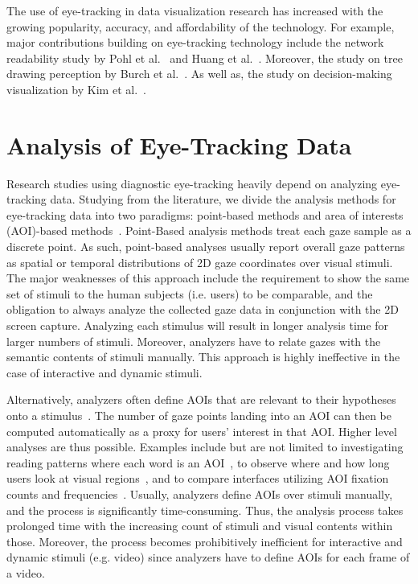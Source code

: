 The use of eye-tracking in data visualization research has increased with the growing popularity, accuracy, and affordability of the technology. For example, major contributions building on eye-tracking technology include the network readability study by Pohl et al.~\cite{Poh09} and Huang et al.~\cite{Hua08, Hua05}. Moreover, the study on tree drawing perception by Burch et al.~\cite{Bur11, Bur13}. As well as, the study on decision-making visualization by Kim et al.~\cite{Kim12}.

\section{Analysis of Eye-Tracking Data}
Research studies using diagnostic eye-tracking heavily depend on analyzing eye-tracking data. Studying from the literature, we divide the analysis methods for eye-tracking data into two paradigms: point-based methods and area of interests (AOI)-based methods~\cite{Bla14}. Point-Based analysis methods treat each gaze sample as a discrete point. As such, point-based analyses usually report overall gaze patterns as spatial or temporal distributions of 2D gaze coordinates over visual stimuli. The major weaknesses of this approach include the requirement to show the same set of stimuli to the human subjects (i.e. users) to be comparable, and the obligation to always analyze the collected gaze data in conjunction with the 2D screen capture. Analyzing each stimulus will result in longer analysis time for larger numbers of stimuli. Moreover, analyzers have to relate gazes with the semantic contents of stimuli manually. This approach is highly ineffective in the case of interactive and dynamic stimuli.

Alternatively, analyzers often define AOIs that are relevant to their hypotheses onto a stimulus~\cite{Bla14}. The number of gaze points landing into an AOI can then be computed automatically as a proxy for users' interest in that AOI. Higher level analyses are thus possible. Examples include but are not limited to investigating reading patterns where each word is an AOI~\cite{Bey05, San04}, to observe where and how long users look at visual regions~\cite{Coco09, Kim12}, and to compare interfaces utilizing AOI fixation counts and frequencies~\cite{Coletkin09}. Usually, analyzers define AOIs over stimuli manually, and the process is significantly time-consuming. Thus, the analysis process takes prolonged time with the increasing count of stimuli and visual contents within those. Moreover, the process becomes prohibitively inefficient for interactive and dynamic stimuli (e.g. video) since analyzers have to define AOIs for each frame of a video.    
  
